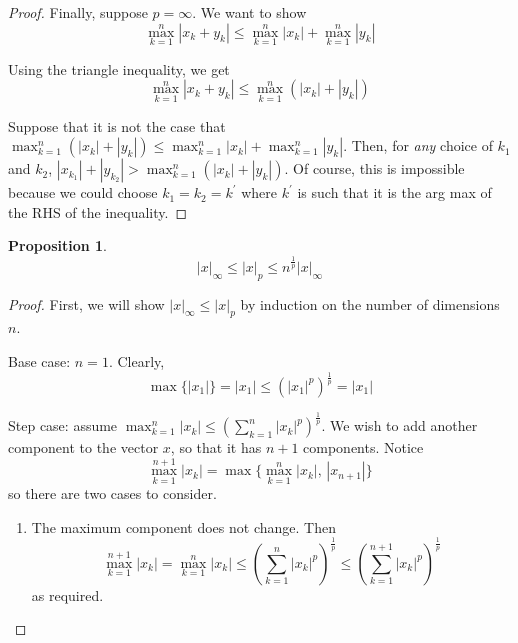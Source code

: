 \documentclass[letterpaper,11pt]{article}
\newtheorem{prop}{Proposition}
\newcommand{\inv}[1]{\frac{1}{#1}}
\begin{document}
\begin{enumerate}
\begin{proof}
            Finally, suppose $p = \infty$. We want to show
            \begin{equation*}
                \max_{k=1}^n |x_k + y_k|
                \leq \max_{k=1}^n |x_k| + \max_{k=1}^n |y_k|
            \end{equation*}

            Using the triangle inequality, we get
            \begin{equation*}
                \max_{k=1}^n |x_k + y_k| \leq \max_{k=1}^n (|x_k| + |y_k|)
            \end{equation*}

            Suppose that it is not the case that
            $\max_{k=1}^n (|x_k| + |y_k|)
            \leq \max_{k=1}^n |x_k| + \max_{k=1}^n |y_k|$. Then, for \emph{any}
            choice of $k_1$ and $k_2$,
            $|x_{k_1}| + |y_{k_2}| > \max_{k=1}^n (|x_k| + |y_k|)$. Of course,
            this is impossible because we could choose $k_1 = k_2 = k^\prime$
            where $k^\prime$ is such that it is the arg max of the RHS of the
            inequality.
        \end{proof}

        \begin{prop}
            $$|x|_\infty \leq |x|_p \leq n^\inv{p} |x|_\infty$$
        \end{prop}

        \begin{proof}
            First, we will show $|x|_\infty \leq |x|_p$ by induction on the
            number of dimensions $n$.

            Base case: $n = 1$. Clearly,
            \begin{equation*}
                \max \{ |x_1| \} = |x_1|
                \leq
                \left(|x_1|^p\right)^\inv{p} = |x_1|
            \end{equation*}

            Step case: assume
            $\max_{k=1}^n |x_k|
            \leq \left(\sum_{k=1}^n |x_k|^p \right)^\inv{p}$. We wish to add
            another component to the vector $x$, so that it has $n+1$
            components. Notice
            \begin{equation*}
                \max_{k=1}^{n+1} |x_k|
                = \max\{\max_{k=1}^n |x_k|,\, |x_{n+1}|\}
            \end{equation*}
            so there are two cases to consider.

            \begin{enumerate}
                \item The maximum component does not change. Then
                    \begin{equation*}
                        \max_{k=1}^{n+1} |x_k| = \max_{k=1}^n |x_k|
                        \leq \left(\sum_{k=1}^n |x_k|^p\right)^\inv{p}
                        \leq \left(\sum_{k=1}^{n+1} |x_k|^p\right)^\inv{p}
                    \end{equation*}
                    as required.


\end{enumerate}
\end{proof}
\end{enumerate}
\end{document}
